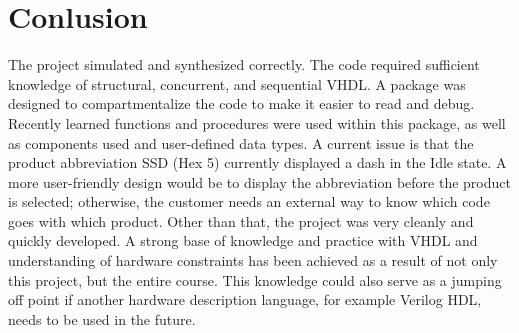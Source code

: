 \documentclass[12pt]{article}
\begin{document}
\section{Conlusion} \label{cncl}
The project simulated and synthesized correctly.  The code required sufficient knowledge of structural, concurrent, and sequential VHDL. A package was designed to compartmentalize the code to make it easier to read and debug.  Recently learned functions and procedures were used within this package, as well as components used and user-defined data types.  A current issue is that the product abbreviation SSD (Hex 5) currently displayed a dash in the Idle state.  A more user-friendly design would be to display the abbreviation before the product is selected; otherwise, the customer needs an external way to know which code goes with which product.  Other than that, the project was very cleanly and quickly developed.  A strong base of knowledge and practice with VHDL and understanding of hardware constraints has been achieved as a result of not only this project, but the entire course.  This knowledge could also serve as a jumping off point if another hardware description language, for example Verilog HDL, needs to be used in the future.
\end{document}
